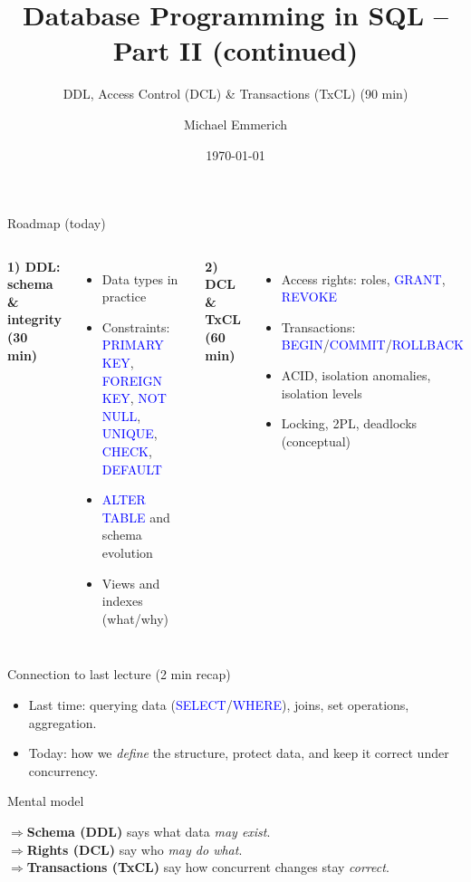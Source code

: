 \documentclass[10pt,aspectratio=169]{beamer}
\title{Database Programming in SQL -- Part II (continued)}
\subtitle{DDL, Access Control (DCL) \& Transactions (TxCL) \; (90 min)}
\author{Michael Emmerich}
\date{\today}
\newcommand{\sqlk}[1]{\textcolor{blue}{#1}}
\begin{document}
\maketitle

\begin{frame}{Roadmap (today)}
\begin{columns}[T,onlytextwidth]
\textbf{1) DDL: schema \& integrity (30 min)}
\begin{itemize}
  \item Data types in practice
  \item Constraints: \sqlk{PRIMARY KEY}, \sqlk{FOREIGN KEY}, \sqlk{NOT NULL}, \sqlk{UNIQUE}, \sqlk{CHECK}, \sqlk{DEFAULT}
  \item \sqlk{ALTER TABLE} and schema evolution
  \item Views and indexes (what/why)
\end{itemize}

\textbf{2) DCL \& TxCL (60 min)}
\begin{itemize}
  \item Access rights: roles, \sqlk{GRANT}, \sqlk{REVOKE}
  \item Transactions: \sqlk{BEGIN}/\sqlk{COMMIT}/\sqlk{ROLLBACK}
  \item ACID, isolation anomalies, isolation levels
  \item Locking, 2PL, deadlocks (conceptual)
\end{itemize}
\end{columns}
\end{frame}

\begin{frame}{Connection to last lecture (2 min recap)}
\begin{itemize}
  \item Last time: querying data (\sqlk{SELECT}/\sqlk{WHERE}), joins, set operations, aggregation.
  \item Today: how we \emph{define} the structure, protect data, and keep it correct under concurrency.
\end{itemize}
\vspace{1mm}
\begin{block}{Mental model}
\medskip

\small
$\Rightarrow$\textbf{Schema (DDL)} says what data \emph{may exist}.\\ \quad\quad
$\Rightarrow$\textbf{Rights (DCL)} say who \emph{may do what}.\\ \quad\quad\quad
$\Rightarrow$\textbf{Transactions (TxCL)} say how concurrent changes stay \emph{correct}.
\end{block}
\end{frame}
\end{document}
